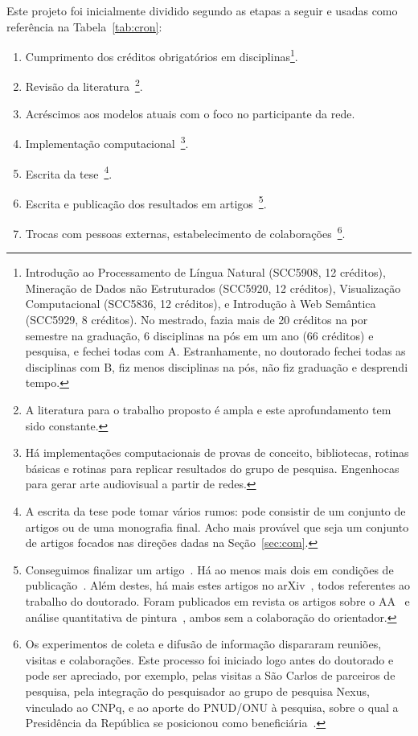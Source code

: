 \documentclass[a4paper,openright,12pt]{report} %
\begin{document}
Este projeto foi inicialmente dividido segundo as etapas a seguir 
e usadas como referência na Tabela~\ref{tab:cron}:

\begin{enumerate}
	\item Cumprimento dos créditos obrigatórios em disciplinas\footnote{Introdução ao Processamento de Língua Natural (SCC5908, 12 créditos),
        Mineração de Dados não Estruturados (SCC5920, 12 créditos), 
        Visualização Computacional (SCC5836, 12 créditos),
        e Introdução à Web Semântica (SCC5929, 8 créditos).
        No mestrado, fazia mais de 20 créditos na por semestre na graduação,
        6 disciplinas na pós em um ano (66 créditos) e pesquisa, e fechei todas com A.
        Estranhamente, no doutorado fechei todas as disciplinas com B, fiz menos disciplinas na pós,
        não fiz graduação e desprendi tempo.
}.

\item Revisão da literatura~\footnote{A literatura para o trabalho proposto é ampla e este aprofundamento tem sido constante.}.

\item Acréscimos aos modelos atuais com o foco no participante da rede.

\item Implementação computacional~\footnote{Há implementações computacionais de provas de conceito, bibliotecas, rotinas básicas e rotinas para replicar resultados do grupo de pesquisa. Engenhocas para gerar arte audiovisual a partir de redes.}.

\item Escrita da tese~\footnote{A escrita da tese pode tomar vários rumos: pode consistir de um conjunto de artigos ou de uma monografia final. Acho mais provável que seja um conjunto de artigos focados nas direções dadas na Seção~\ref{sec:com}.}.

\item Escrita e publicação dos resultados em artigos~\footnote{Conseguimos finalizar um artigo~\cite{timeS}. Há ao menos mais dois em condições de publicação~\cite{ops,mass}. Além destes, há mais estes artigos no arXiv~\cite{ensaio,rcText,continuousV,versinus}, todos referentes ao trabalho do doutorado. Foram publicados em revista os artigos sobre o AA~\cite{paaper} e análise quantitativa de pintura~\cite{painting}, ambos sem a colaboração do orientador.}.

\item Trocas com pessoas externas, estabelecimento de colaborações~\footnote{Os experimentos de coleta e difusão de informação dispararam reuniões, visitas e colaborações. Este processo foi iniciado logo antes do doutorado e pode ser apreciado, por exemplo, pelas visitas a São Carlos de parceiros de pesquisa, pela integração do pesquisador ao grupo de pesquisa Nexus, vinculado ao CNPq, e ao aporte do PNUD/ONU à pesquisa, sobre o qual a Presidência da República se posicionou como beneficiária~\cite{ensaio}.}.
\end{enumerate}
\end{document}
